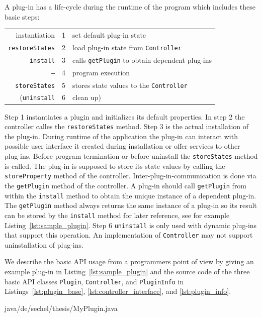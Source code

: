 A plug-in has a life-cycle during the runtime of the program which includes these basic
steps:
\begin{center}
\begin{tabular}{r|r|l}
	instantiation & 1 & set default plug-in state\\
	{\tt restoreStates} & 2 & load plug-in state from {\tt Controller}\\
	{\tt install} & 3 & calls {\tt getPlugin} to obtain dependent plug-ins\\
	{\tt --}  & 4 & program execution\\
	{\tt storeStates} & 5 & stores state values to the {\tt Controller}\\
	({\tt uninstall} & 6 & clean up)
\end{tabular}
\end{center}
Step 1 instantiates a plugin and initializes its default properties. In step 2 the controller 
calles the {\tt restoreStates} method. Step 3 is the actual installation of the plug-in. 
During runtime
of the application the plug-in can interact with possible user interface it created during 
installation or offer services to other plug-ins. 
Before program termination or before uninstall the {\tt storeStates} method is called. The plug-in
is supposed to store its state values by calling the {\tt storeProperty}
method of the controller.
Inter-plug-in-communication is done via the {\tt getPlugin} method of the controller. 
A plug-in should call {\tt getPlugin} from within the {\tt install} method to obtain the unique instance 
of a dependent plug-in. The {\tt getPlugin} method always returns the same instance of a plug-in so its
result can be stored by the {\tt install} method for later reference, see for example 
Listing~\ref{lst:sample_plugin}. Step 6 {\tt uninstall} is only used with dynamic plug-ins that support 
this operation. An implementation of {\tt Controller} may not support uninstallation of plug-ins.

We describe the basic API usage from a programmers point of view by giving an example plug-in
in Listing~\ref{lst:sample_plugin} and the source code of the three basic API classes 
{\tt Plugin}, {\tt Controller}, and {\tt PluginInfo} in Listings~\ref{lst:plugin_base}, 
\ref{lst:controller_interface}, and \ref{lst:plugin_info}.

 {java/de/sechel/thesis/MyPlugin.java}

